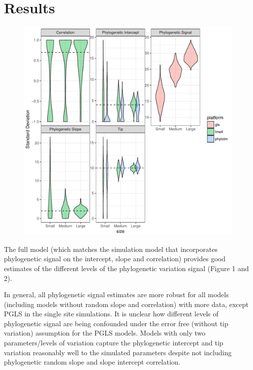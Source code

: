 \section{Results}

\begin{center}
\begin{figure}[h]
\includegraphics[scale=0.8,page=1]{./git_push/ssplot.pdf}
\label{ssplot}
\end{figure}
\end{center}

The full model (which matches the simulation model that incorporates phylogenetic signal on the intercept, slope and correlation) provides good estimates of the different levels of the phylogenetic variation signal (Figure 1 and 2).

In general, all phylogenetic signal estimates are more robust for all models (including models without random slope and correlation) with more data, except PGLS in the single site simulations. 
It is unclear how different levels of phylogenetic signal are being confounded under the error free (without tip variation) assumption for the PGLS models.
Models with only two parameters/levels of variation capture the phylogenetic intercept and tip variation reasonably well to the simulated parameters despite not including phylogenetic random slope and slope intercept correlation.

